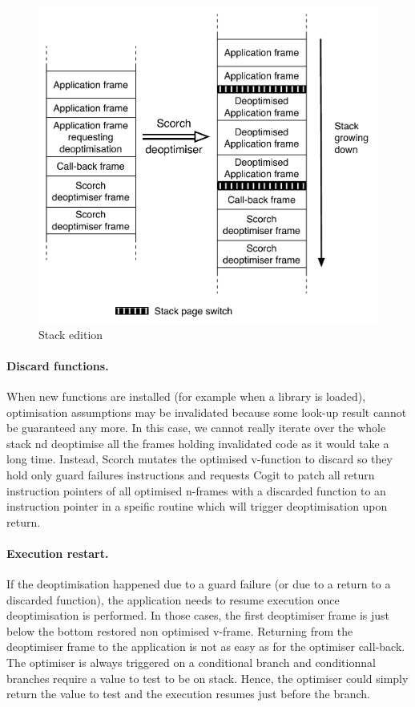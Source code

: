 \documentclass[a4paper,12pt,twoside]{../includes/ThesisStyle}
\begin{document}
\begin{figure}[h!]
    \begin{center}
		\includegraphics[width=0.85\linewidth]{DeoptStacks}
        \caption{Stack edition}
        \label{fig:DeoptStacks}
    \end{center}
\end{figure}

\paragraph{Discard functions.} When new functions are installed (for example when a library is loaded), optimisation assumptions may be invalidated because some look-up result cannot be guaranteed any more. In this case, we cannot really iterate over the whole stack nd deoptimise all the frames holding invalidated code as it would take a long time. Instead, Scorch mutates the optimised v-function to discard so they hold only guard failures instructions and requests Cogit to patch all return instruction pointers of all optimised n-frames with a discarded function to an instruction pointer in a speific routine which will trigger deoptimisation upon return.

\paragraph{Execution restart.}

If the deoptimisation happened due to a guard failure (or due to a return to a discarded function), the application needs to resume execution once deoptimisation is performed. In those cases, the first deoptimiser frame is just below the bottom restored non optimised v-frame. Returning from the deoptimiser frame to the application is not as easy as for the optimiser call-back. The optimiser is always triggered on a conditional branch and conditionnal branches require a value to test to be on stack. Hence, the optimiser could simply return the value to test and the execution resumes just before the branch. 
\end{document}
